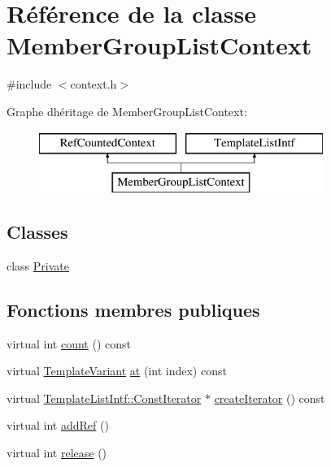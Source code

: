 \hypertarget{class_member_group_list_context}{}\section{Référence de la classe Member\+Group\+List\+Context}
\label{class_member_group_list_context}


{\ttfamily \#include $<$context.\+h$>$}

Graphe d\textquotesingle{}héritage de Member\+Group\+List\+Context\+:\begin{figure}[H]
\begin{center}
\leavevmode
\includegraphics[height=2.000000cm]{class_member_group_list_context}
\end{center}
\end{figure}
\subsection*{Classes}
\begin{DoxyCompactItemize}
\item 
class \hyperlink{class_member_group_list_context_1_1_private}{Private}
\end{DoxyCompactItemize}
\subsection*{Fonctions membres publiques}
\begin{DoxyCompactItemize}
\item 
virtual int \hyperlink{class_member_group_list_context_aa3391b5e1dd5d2c829d2570ff2469a76}{count} () const 
\item 
virtual \hyperlink{class_template_variant}{Template\+Variant} \hyperlink{class_member_group_list_context_a28254ec245783ae0c9de461ff26e48a0}{at} (int index) const 
\item 
virtual \hyperlink{class_template_list_intf_1_1_const_iterator}{Template\+List\+Intf\+::\+Const\+Iterator} $\ast$ \hyperlink{class_member_group_list_context_ad50d24dee355f0138f495b72ac174deb}{create\+Iterator} () const 
\item 
virtual int \hyperlink{class_member_group_list_context_a3a135dbacc0e65f809b61797db5dbc4a}{add\+Ref} ()
\item 
virtual int \hyperlink{class_member_group_list_context_afc46c3c1646126f13c4357c4800a5fe0}{release} ()
\end{DoxyCompactItemize}
